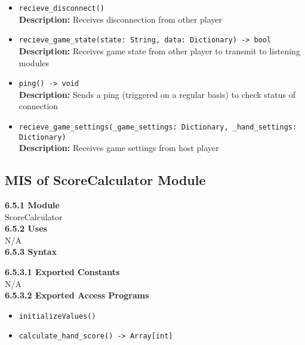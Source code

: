\documentclass[12pt, titlepage]{article}
\begin{document}
\begin{itemize}
    \item \texttt{recieve\_disconnect()}\\
    \textbf{Description:} Receives disconnection from other player
    
    \item \texttt{recieve\_game\_state(state: String, data: Dictionary) -> bool}\\
    \textbf{Description:} Receives game state from other player to transmit to listening modules
    
    \item \texttt{ping() -> void}\\
    \textbf{Description:} Sends a ping (triggered on a regular basis) to check status of connection
    
    \item \texttt{recieve\_game\_settings(\_game\_settings: Dictionary, \_hand\_settings: Dictionary)}\\
    \textbf{Description:} Receives game settings from host player
\end{itemize}


\subsection{MIS of ScoreCalculator Module}\label{ScoreCalculator}
\textbf{6.5.1 Module}\\
 ScoreCalculator\\

\noindent \textbf{6.5.2 Uses}\\

N/A \\

\noindent \textbf{6.5.3 Syntax}

\noindent \textbf{6.5.3.1 Exported Constants}\\

 \noindent N/A\\

\textbf{6.5.3.2 Exported Access Programs}
\begin{itemize}
	\item \texttt{initializeValues()}
	\item \texttt{calculate\_hand\_score() -> Array[int]}
	
\end{itemize}
\end{document}
